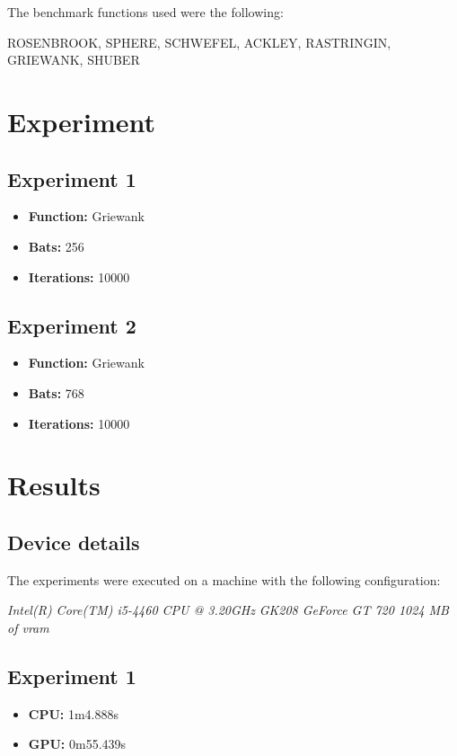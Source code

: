 \documentclass[12pt]{article}
\begin{document}
The benchmark functions used were the following:

ROSENBROOK, SPHERE, SCHWEFEL, ACKLEY, RASTRINGIN, GRIEWANK, SHUBER

\section{Experiment}

\subsection{Experiment 1}

\begin{itemize}
\item \textbf{Function:} Griewank
\item \textbf{Bats:} 256
\item \textbf{Iterations:} 10000
\end{itemize}


\subsection{Experiment 2}

\begin{itemize}
\item \textbf{Function:} Griewank
\item \textbf{Bats:} 768
\item \textbf{Iterations:} 10000
\end{itemize}

\section{Results}

\subsection{Device details}

The experiments were executed on a machine with the following configuration:

\textit{Intel(R) Core(TM) i5-4460  CPU @ 3.20GHz}
\textit{GK208 GeForce GT 720 1024 MB of vram}

\subsection{Experiment 1}

\begin{itemize}
    \item \textbf{CPU:} 1m4.888s
    \item \textbf{GPU:} 0m55.439s
\end{itemize}
\end{document}
